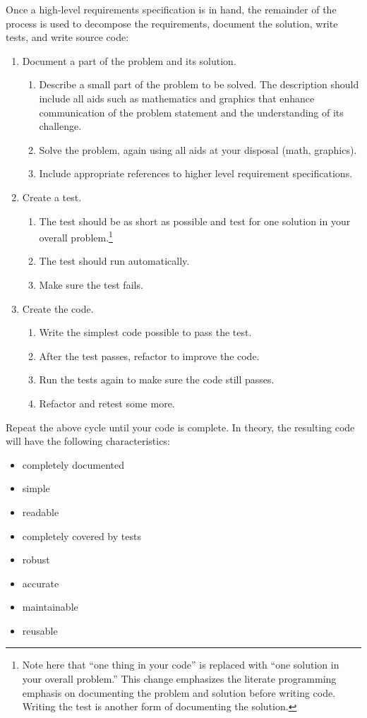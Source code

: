 Once a high-level requirements specification is in hand, the remainder of the \seamless process is
used to decompose the requirements, document the solution, write tests, and write source code:
\begin{enumerate}
\item Document a part of the problem and its solution.
  \begin{enumerate}
  \item Describe a small part of the problem to be solved. The description should include    
all aids such as mathematics and graphics that enhance communication of the problem 
statement and the understanding of its challenge. 
  \item Solve the problem, again using all aids at your disposal (\eg math, graphics).
  \item Include appropriate references to higher level requirement specifications.
  \end{enumerate}
\item Create a test. 
\begin{enumerate}
  \item The test should be as short as possible and test for one solution in your overall
  problem.\footnote{Note here that ``one thing in your code'' is replaced with ``one
  solution in your overall problem.'' This change emphasizes the literate programming emphasis
  on documenting the problem and solution before writing code. Writing the test is another
  form of documenting the solution.}
  \item The test should run automatically.
  \item Make sure the test fails. 
\end{enumerate}
\item Create the code.
  \begin{enumerate}
  \item Write the simplest code possible to pass the test. 
  \item After the test passes, refactor to improve the code. 
  \item Run the tests again to make sure the code still passes.
  \item Refactor and retest some more.
  \end{enumerate}
\end{enumerate}

Repeat the above cycle until your code is complete. In theory, the resulting code will 
have the following characteristics:
\begin{itemize}
  \item completely documented
  \item simple
  \item readable
  \item completely covered by tests
  \item robust
  \item accurate
  \item maintainable
  \item reusable
\end{itemize}

